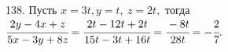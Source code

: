 138. Пусть $x=3t, y=t,\ z=2t,$ тогда $\cfrac{2y-4x+z}{5x-3y+8z}=\cfrac{2t-12t+2t}{15t-3t+16t}=\cfrac{-8t}{28t}=-\cfrac{2}{7}.$\\
